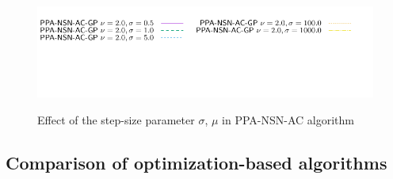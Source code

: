 \documentclass[a4paper]{article}
\begin{document}
\begin{figure}
 \\
{\includegraphics[height=\legendheight]{../figure/PROX/Parameters/nu20/1.0e-08/50/time/profile-Chain_legend.pdf}}
  \caption{Effect of the step-size parameter $\sigma$, $\mu$ in PPA-NSN-AC algorithm}
  \label{fig:PROX/Parameters/nu20}
\end{figure}

\subsection{Comparison of optimization-based algorithms}
\end{document}
